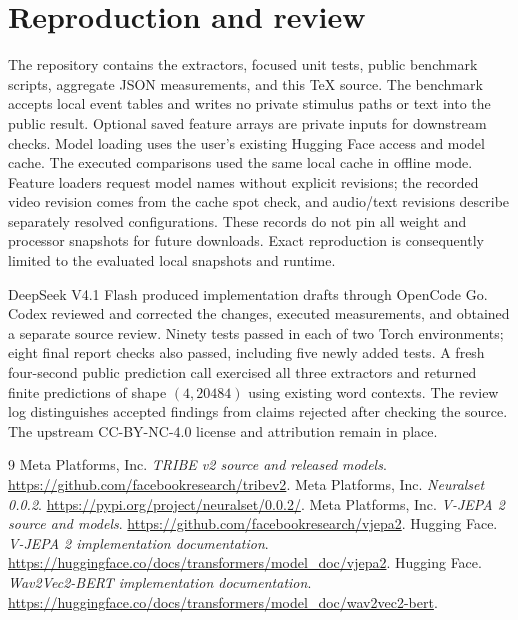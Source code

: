 \documentclass[10pt]{article}
\begin{document}
\section{Reproduction and review}
The repository contains the extractors, focused unit tests, public benchmark
scripts, aggregate JSON measurements, and this TeX source. The benchmark accepts
local event tables and writes no private stimulus paths or text into the public
result. Optional saved feature arrays are private inputs for downstream checks.
Model loading uses the user's existing Hugging Face access and model cache.
The executed comparisons used the same local cache in offline mode. Feature
loaders request model names without explicit revisions; the recorded video
revision comes from the cache spot check, and audio/text revisions describe
separately resolved configurations. These records do not pin all weight and
processor snapshots for future downloads. Exact reproduction is consequently
limited to the evaluated local snapshots and runtime.

DeepSeek V4.1 Flash produced implementation drafts through OpenCode Go. Codex
reviewed and corrected the changes, executed measurements, and obtained a
separate source review. Ninety tests passed in each of two Torch environments;
eight final report checks also passed, including five newly added tests. A fresh
four-second public prediction call exercised all three extractors and returned
finite predictions of shape $(4,20484)$ using existing word contexts. The review log distinguishes accepted findings from
claims rejected after checking the source. The upstream CC-BY-NC-4.0 license
and attribution remain in place.


\begin{thebibliography}{9}
 Meta Platforms, Inc. \emph{TRIBE v2 source and released models}.
\url{https://github.com/facebookresearch/tribev2}.
 Meta Platforms, Inc. \emph{Neuralset 0.0.2}.
\url{https://pypi.org/project/neuralset/0.0.2/}.
 Meta Platforms, Inc. \emph{V-JEPA 2 source and models}.
\url{https://github.com/facebookresearch/vjepa2}.
 Hugging Face. \emph{V-JEPA 2 implementation documentation}.
\url{https://huggingface.co/docs/transformers/model_doc/vjepa2}.
 Hugging Face. \emph{Wav2Vec2-BERT implementation documentation}.
\url{https://huggingface.co/docs/transformers/model_doc/wav2vec2-bert}.
\end{thebibliography}
\end{document}
